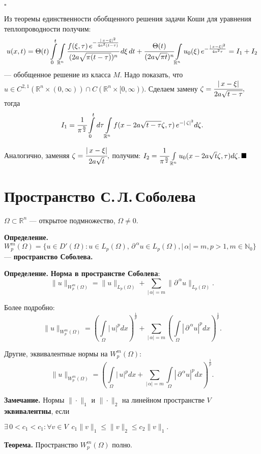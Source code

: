 \documentclass[12pt,a4paper,draft]{article}
\DeclareRobustCommand*{\т}{~--- }
\DeclareRobustCommand*{\ч}{~-- }
\begin{document}
$\square$

Из теоремы единственности обобщенного решения задачи Коши для
уравнения теплопроводности получим:
$$u(x,t)=
\Theta(t)\int\limits_0^t \int\limits_{\mathbb R^n}
\cfrac{f(\xi,\tau)\,e^{-\frac{|\,x-\xi|^2}{4a^2(t-\tau)}}}
{(2a\sqrt{\pi(t-\tau)})^n}\,d\xi\,dt+
\cfrac{\Theta(t)}{(2a\sqrt{\pi t})^n} \int\limits_{\mathbb
R^n}u_0(\xi)\,e^{-\frac{|\,x-\xi|^2}{4a^2\tau}}=I_1+I_2$$
--- обобщенное решение из класса $M$. Надо показать, что $u\in C^{2,1}(\mathbb R^n\times(0,\infty))\cap C(\mathbb
R^n\times[0,\infty))$. Сделаем замену
$\zeta=\cfrac{|\,x-\xi|}{2a\sqrt{t-\tau}},$ тогда
$$I_1=\cfrac1{\pi^{\frac n2}}\int\limits_0^t d\tau \int\limits_{\mathbb R^n}
f(x-2a\sqrt{t-\tau}\zeta,\tau)\,e^{-|\,\zeta|^2}d\zeta.$$

Аналогично, заменяя $\zeta=\cfrac{|\,x-\xi|}{2a\sqrt{t}},$
получим: $I_2=\cfrac1{\pi^{\frac n2}} \int\limits_{\mathbb R^n}
u_0(x-2a\sqrt{t}\zeta,\tau)d\zeta.\,\blacksquare$

\section{Пространство С.\,Л.\,Соболева}

$\Omega\subset\mathbb R^{n}$ --- открытое подмножество,
$\Omega\ne0.$

\textbf{Определение.} $W_p^m(\Omega)=\{u\in D'(\Omega)\colon u\in
L_p(\Omega),\,\partial^{\,\alpha} u \in L_p (\Omega),|\,\alpha|=m,
p>1,m\in\mathbb N_0\}$
--- \textbf{пространство Соболева.}

\textbf{Определение.} \textbf{Норма в пространстве Соболева}:
$$\|u\|_{W_p^m(\Omega)}=\|u\|_{L_p(\Omega)}+\sum_{|\,\alpha|=m}
\|\partial^{\,\alpha}u\|_{L_p(\Omega)}.$$

Более подробно:
$$\|u\|_{W_p^m(\Omega)}=\left(\int\limits_{\Omega}|\,u|^p dx\right)^{\frac1p}
+\sum_{|\,\alpha|=m}\left(\int\limits_{\Omega}|\,\partial^{\,\alpha}u|^p
dx\right)^{\frac1p}.$$

Другие, эквивалентные нормы на $W_p^m(\Omega)$:
$$\|u\|_{W_p^m(\Omega)}=\left(\int\limits_{\Omega}|\,u|^p dx
+\sum_{|\,\alpha|=m}\int\limits_{\Omega}|\,\partial^{\,\alpha}u|^p
dx\right)^{\frac1p}.$$

\textbf{Замечание.} Нормы $\|\cdot\|_1$ и $\|\cdot\|_2$ на
линейном пространстве $V$ \textbf{эквивалентны}, если

$\exists \,0<c_1<c_1\colon \forall v\in V\,\,\,
c_1\|v\|_1\le\|v\|_2\le c_2\|v\|_1.$

\textbf{Теорема.} Пространство $W_p^m(\Omega)$ полно.
\end{document}
